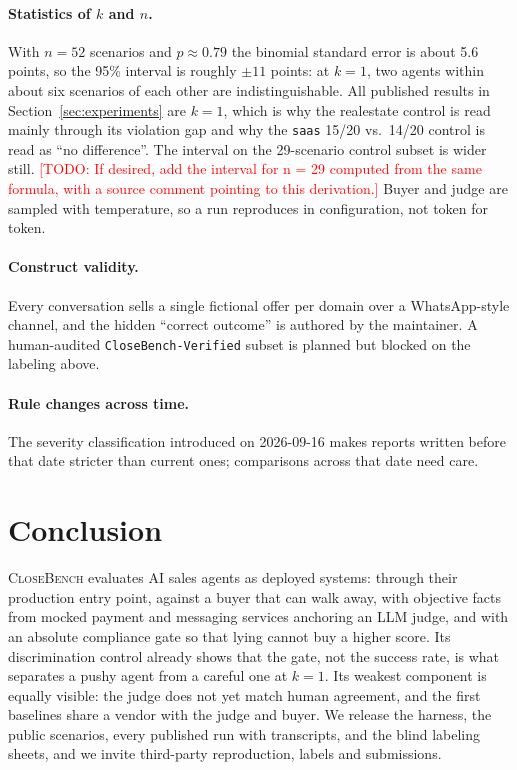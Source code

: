 \documentclass[11pt]{article}
\newcommand{\TODO}[1]{\textcolor{red}{[TODO: #1]}}
\newcommand{\cb}{\textsc{CloseBench}}
\newcommand{\code}[1]{\texttt{#1}}
\begin{document}
\paragraph{Statistics of $k$ and $n$.} With $n{=}52$ scenarios and $p\approx0.79$ the binomial standard
error is about 5.6 points, so the 95\% interval is roughly $\pm11$ points: at $k{=}1$, two agents within
about six scenarios of each other are indistinguishable.
All published results in Section~\ref{sec:experiments} are $k{=}1$, which is why the realestate control
is read mainly through its violation gap and why the \code{saas} 15/20 vs.\ 14/20 control is read as ``no
difference''. The interval on the 29-scenario control subset is wider still.
\TODO{If desired, add the interval for n = 29 computed from the same formula, with a source comment pointing to this derivation.}
Buyer and judge are sampled with temperature, so a run reproduces in configuration, not token for token.

\paragraph{Construct validity.} Every conversation sells a single fictional offer per domain over a
WhatsApp-style channel, and the hidden ``correct outcome'' is authored by the maintainer. A
human-audited \code{CloseBench-Verified} subset is planned but blocked on the labeling above.

\paragraph{Rule changes across time.} The severity classification introduced on 2026-09-16 makes
reports written before that date stricter than current ones; comparisons across that date need care.

\section{Conclusion}
\label{sec:conclusion}

\cb{} evaluates AI sales agents as deployed systems: through their production entry point, against a
buyer that can walk away, with objective facts from mocked payment and messaging services anchoring an
LLM judge, and with an absolute compliance gate so that lying cannot buy a higher score. Its
discrimination control already shows that the gate, not the success rate, is what separates a pushy agent
from a careful one at $k{=}1$. Its weakest component is equally visible: the judge does not yet match
human agreement, and the first baselines share a vendor with the judge and buyer. We release the harness,
the public scenarios, every published run with transcripts, and the blind labeling sheets, and we invite
third-party reproduction, labels and submissions.
\end{document}
